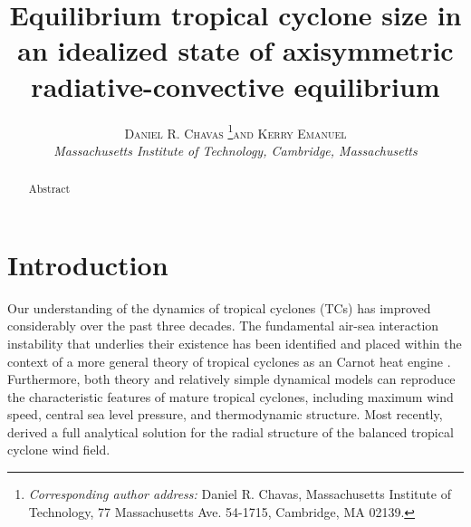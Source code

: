 \documentclass[12pt]{article}
\newcommand{\myabstract}{Abstract}
\begin{document}
%
%
\title{\textbf{\large{Equilibrium tropical cyclone size in an idealized state of axisymmetric radiative-convective equilibrium}}}
%
%
\author{\textsc{Daniel R. Chavas}
				\thanks{\textit{Corresponding author address:} 
				Daniel R. Chavas, Massachusetts Institute of Technology, 
				77 Massachusetts Ave. 54-1715, Cambridge, MA 02139. 
				}\quad\textsc{and Kerry Emanuel}\\
\textit{\footnotesize{Massachusetts Institute of Technology, Cambridge, Massachusetts}}
}
%
{
\twocolumn[
\begin{@twocolumnfalse}
\amstitle

\begin{center}
\begin{minipage}{13.0cm}
\begin{abstract}
	\myabstract
	\newline
	\begin{center}
		\rule{38mm}{0.2mm}
	\end{center}
\end{abstract}
\end{minipage}
\end{center}
\end{@twocolumnfalse}
]
}
{
\amstitle
\begin{abstract}
\myabstract
\end{abstract}
\newpage
}

\section{Introduction}
Our understanding of the dynamics of tropical cyclones (TCs) has improved considerably over the past three decades. The fundamental air-sea interaction instability that underlies their existence has been identified and placed within the context of a more general theory of tropical cyclones as an Carnot heat engine \citep{Emanuel_1986}. Furthermore, both theory and relatively simple dynamical models \citep{Emanuel_1995a, Rotunno_Emanuel_1987} can reproduce the characteristic features of mature tropical cyclones, including maximum wind speed, central sea level pressure, and thermodynamic structure. Most recently, \cite{Emanuel_Rotunno_2011} derived a full analytical solution for the radial structure of the balanced tropical cyclone wind field.
\end{document}
